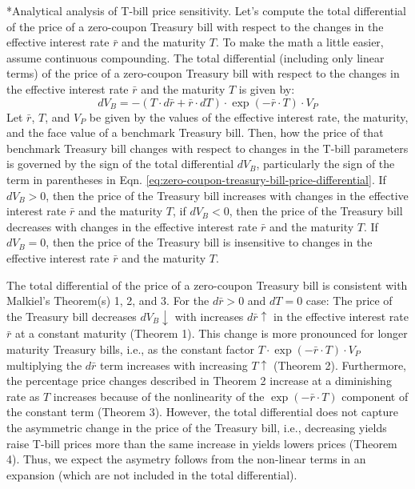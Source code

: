 \documentclass[11pt]{article}
\makeatletter
\theoremstyle{definition}
\renewcommand\subsubsection{\@startsection
	{subsubsection}{2}{0mm}
	{-0.05in}
	{-0.5\baselineskip}
	{\normalfont\normalsize\itshape\bfseries}}
\makeatother
\begin{document}
\subsubsection*{Analytical analysis of T-bill price sensitivity.}
Let's compute the total differential of the price of a zero-coupon Treasury bill with respect to the changes in the effective interest rate $\bar{r}$ and the maturity $T$.
To make the math a little easier, assume continuous compounding. The total differential (including only linear terms) of the price of a zero-coupon Treasury bill with respect to the changes in the effective interest rate $\bar{r}$ and the maturity $T$ is given by:
\begin{equation}\label{eq:zero-coupon-treasury-bill-price-differential}
	dV_{B} = -\left(T\cdot{d\bar{r}}+\bar{r}\cdot{dT}\right)\cdot\exp(-\bar{r}\cdot{T})\cdot{V_{P}}
\end{equation}
Let $\bar{r}$, $T$, and $V_{P}$ be given by the values of the effective interest rate, the maturity, and the face value of a benchmark Treasury bill.
Then, how the price of that benchmark Treasury bill changes with respect to changes in the T-bill parameters is governed by the sign of the total differential $dV_{B}$, 
particularly the sign of the term in parentheses in Eqn. \eqref{eq:zero-coupon-treasury-bill-price-differential}. If $dV_{B}>0$, then the price of the Treasury bill increases with changes in the effective interest rate $\bar{r}$ and the maturity $T$, 
if $dV_{B}<0$, then the price of the Treasury bill decreases with changes in the effective interest rate $\bar{r}$ and the maturity $T$.
If $dV_{B}=0$, then the price of the Treasury bill is insensitive to changes in the effective interest rate $\bar{r}$ and the maturity $T$. 

The total differential of the price of a zero-coupon Treasury bill is consistent with Malkiel's Theorem(s) 1, 2, and 3. For the $d\bar{r}>0$ and $dT=0$ case: The price of the Treasury bill decreases $dV_{B}\downarrow$ with increases $d\bar{r}\uparrow$ in the effective interest rate $\bar{r}$ at a constant maturity (Theorem 1). 
This change is more pronounced for longer maturity Treasury bills, i.e., as the constant factor $T\cdot\exp(-\bar{r}\cdot{T})\cdot{V}_{P}$ multiplying the $d\bar{r}$ term increases with increasing $T\uparrow$ (Theorem 2).
Furthermore, the percentage price changes described in Theorem 2 increase at a diminishing rate as $T$ increases because of the nonlinearity of the $\exp(-\bar{r}\cdot{T})$ component of the constant term (Theorem 3).
However, the total differential does not capture the asymmetric change in the price of the Treasury bill, i.e., decreasing yields raise T-bill prices more than the same increase in yields lowers prices (Theorem 4).
Thus, we expect the asymetry follows from the non-linear terms in an expansion (which are not included in the total differential).
\end{document}
